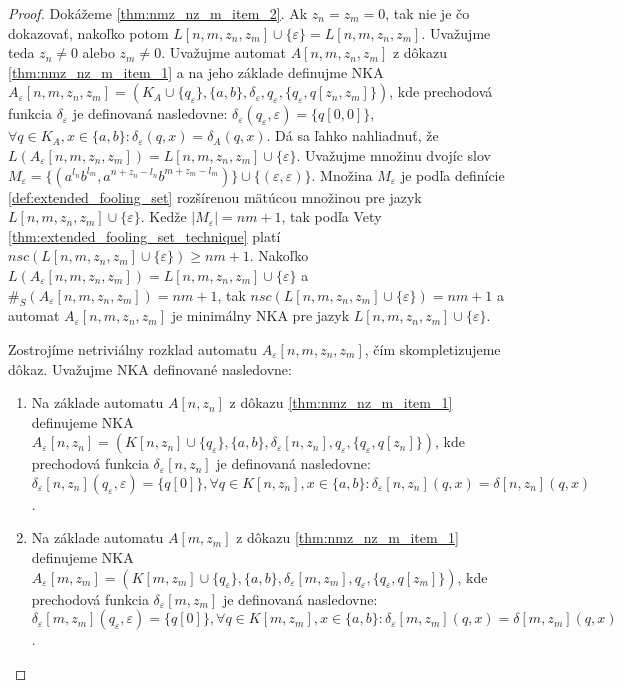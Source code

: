\begin{proof}
\par
Dokážeme \ref{thm:nmz_nz_m_item_2}. Ak $ z_n=z_m=0 $, tak nie je čo dokazovať, nakoľko potom $ L[n,m,z_n,z_m] \cup \lbrace \varepsilon \rbrace = L[n,m,z_n,z_m] $. Uvažujme teda $ z_n \neq 0 $ alebo $ z_m \neq 0 $. Uvažujme automat $ A[n,m,z_n,z_m] $ z dôkazu \ref{thm:nmz_nz_m_item_1} a na jeho základe definujme NKA $ A_{\varepsilon}[n,m,z_n,z_m] = (K_A \cup \lbrace q_{\varepsilon} \rbrace, \lbrace a,b \rbrace, \delta_{\varepsilon}, q_{\varepsilon}, \lbrace q_{\varepsilon}, q[z_n,z_m] \rbrace) $, kde prechodová funkcia $ \delta_{\varepsilon} $ je definovaná nasledovne: $ \delta_{\varepsilon}(q_{\varepsilon},\varepsilon) = \lbrace q[0,0] \rbrace $, $ \forall q \in K_A, x \in \lbrace a,b \rbrace: \delta_{\varepsilon}(q,x) = \delta_A(q,x) $. Dá sa ľahko nahliadnuť, že $ L(A_{\varepsilon}[n,m,z_n,z_m]) = L[n,m,z_n,z_m] \cup \lbrace \varepsilon \rbrace $. Uvažujme množinu dvojíc slov $ M_{\varepsilon} = \lbrace (a^{l_n}b^{l_m},a^{n+z_n-l_n}b^{m+z_m-l_m}) \rbrace \cup \lbrace (\varepsilon,\varepsilon) \rbrace $. Množina $ M_{\varepsilon} $ je podľa definície \ref{def:extended_fooling_set} rozšírenou mätúcou množinou pre jazyk $ L[n,m,z_n,z_m] \cup \lbrace \varepsilon \rbrace $. Kedže $ |M_{\varepsilon}| = nm+1 $, tak podľa Vety \ref{thm:extended_fooling_set_technique} platí $ nsc(L[n,m,z_n,z_m] \cup \lbrace \varepsilon \rbrace) \geq nm+1$. Nakoľko $ L(A_{\varepsilon}[n,m,z_n,z_m]) = L[n,m,z_n,z_m] \cup \lbrace \varepsilon \rbrace $ a $ \#_S(A_{\varepsilon}[n,m,z_n,z_m]) = nm+1 $, tak $ nsc(L[n,m,z_n,z_m] \cup \lbrace \varepsilon \rbrace) = nm+1 $ a automat $ A_{\varepsilon}[n,m,z_n,z_m] $ je minimálny NKA pre jazyk $ L[n,m,z_n,z_m] \cup \lbrace \varepsilon \rbrace $.
\par
Zostrojíme netriviálny rozklad automatu $ A_{\varepsilon}[n,m,z_n,z_m] $, čím skompletizujeme dôkaz. Uvažujme NKA definované nasledovne:
\begin{enumerate}  
\item Na základe automatu $ A[n,z_n] $ z dôkazu \ref{thm:nmz_nz_m_item_1} definujeme NKA $ A_{\varepsilon}[n,z_n] = (K[n,z_n] \cup \lbrace q_{\varepsilon} \rbrace, \lbrace a,b \rbrace, \delta_{\varepsilon}[n,z_n], q_{\varepsilon}, \lbrace q_{\varepsilon}, q[z_n] \rbrace) $, kde prechodová funkcia $ \delta_{\varepsilon}[n,z_n] $ je definovaná nasledovne: $ \delta_{\varepsilon}[n,z_n](q_{\varepsilon},\varepsilon) = \lbrace q[0] \rbrace, \forall q \in K[n,z_n], x \in \lbrace a,b \rbrace: \delta_{\varepsilon}[n,z_n](q,x) = \delta[n,z_n](q,x) $.
\item Na základe automatu $ A[m,z_m] $ z dôkazu \ref{thm:nmz_nz_m_item_1} definujeme NKA $ A_{\varepsilon}[m,z_m] = (K[m,z_m] \cup \lbrace q_{\varepsilon} \rbrace, \lbrace a,b \rbrace, \delta_{\varepsilon}[m,z_m], q_{\varepsilon}, \lbrace q_{\varepsilon}, q[z_m] \rbrace) $, kde prechodová funkcia $ \delta_{\varepsilon}[m,z_m] $ je definovaná nasledovne: $ \delta_{\varepsilon}[m,z_m](q_{\varepsilon},\varepsilon) = \lbrace q[0] \rbrace, \forall q \in K[m,z_m], x \in \lbrace a,b \rbrace: \delta_{\varepsilon}[m,z_m](q,x) = \delta[m,z_m](q,x) $.

\end{enumerate}
\end{proof}

